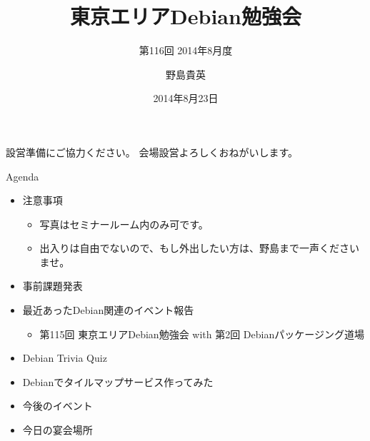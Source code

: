 \title{東京エリアDebian勉強会}
\subtitle{第116回 2014年8月度}
\author{野島貴英}
\date{2014年8月23日}



\begin{frame}
\titlepage{}
\end{frame}

\begin{frame}{設営準備にご協力ください。}
会場設営よろしくおねがいします。
\end{frame}

\begin{frame}{Agenda}
 \begin{minipage}[t]{0.45\hsize}
  \begin{itemize}
   \item 注意事項
	 \begin{itemize}
	  \item 写真はセミナールーム内のみ可です。
          \item 出入りは自由でないので、もし外出したい方は、野島まで一声くださいませ。
	 \end{itemize}
   \item 事前課題発表
  \end{itemize}
 \end{minipage} 
 \begin{minipage}[t]{0.45\hsize}
  \begin{itemize}
   \item 最近あったDebian関連のイベント報告
	 \begin{itemize}
	  \item 第115回 東京エリアDebian勉強会 with 第2回 Debianパッケージング道場
	 \end{itemize}
   \item Debian Trivia Quiz
   \item Debianでタイルマップサービス作ってみた
   \item 今後のイベント
   \item 今日の宴会場所
  \end{itemize}
 \end{minipage}
\end{frame}

